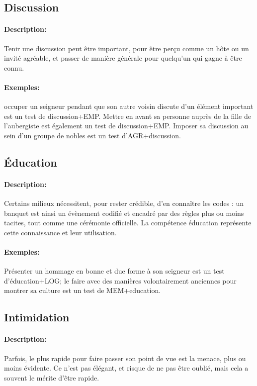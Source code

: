 \documentclass[10pt,a4paper,twocolumn]{book}
\begin{document}
\subsection{Discussion}
\paragraph{Description:}Tenir une discussion peut être important, pour être perçu comme un hôte ou un invité agréable, et passer de manière générale pour quelqu'un qui gagne à être connu.
\paragraph{Exemples:}occuper un seigneur pendant que son autre voisin discute d'un élément important est un test de discussion+EMP. Mettre en avant sa personne auprès de la fille de l'aubergiste est également un test de discussion+EMP. Imposer sa discussion au sein d'un groupe de nobles est un test d'AGR+discussion.
\subsection{Éducation}
\paragraph{Description:}Certains milieux nécessitent, pour rester crédible, d'en connaître les codes : un banquet est ainsi un évènement codifié et encadré par des règles plus ou moins tacites, tout comme une cérémonie officielle. La compétence éducation représente cette connaissance et leur utilisation.
\paragraph{Exemples:}Présenter un hommage en bonne et due forme à son seigneur est un test d'éducation+LOG; le faire avec des manières volontairement anciennes pour montrer sa culture est un test de MEM+education.
\subsection{Intimidation}
\paragraph{Description:}Parfois, le plus rapide pour faire passer son point de vue est la menace, plus ou moins évidente. Ce n'est pas élégant, et risque de ne pas être oublié, mais cela a souvent le mérite d'être rapide.
\end{document}
